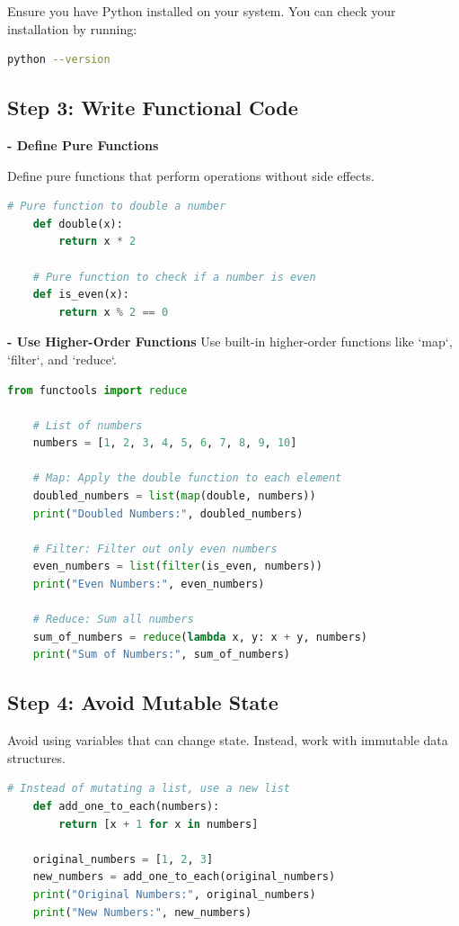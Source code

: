 \documentclass[12pt]{article}
\begin{document}
Ensure you have Python installed on your system. You can check your installation by running:
\begin{lstlisting}[language = sh]
    python --version
\end{lstlisting}

\subsection{Step 3: Write Functional Code}

\textbf{- Define Pure Functions}

Define pure functions that perform operations without side effects.
\begin{lstlisting}[language = Python]
    # Pure function to double a number
    def double(x):
        return x * 2
    
    # Pure function to check if a number is even
    def is_even(x):
        return x % 2 == 0
\end{lstlisting}

\textbf{- Use Higher-Order Functions}
Use built-in higher-order functions like `map`, `filter`, and `reduce`.

\begin{lstlisting}[language = Python]
    from functools import reduce

    # List of numbers
    numbers = [1, 2, 3, 4, 5, 6, 7, 8, 9, 10]
    
    # Map: Apply the double function to each element
    doubled_numbers = list(map(double, numbers))
    print("Doubled Numbers:", doubled_numbers)
    
    # Filter: Filter out only even numbers
    even_numbers = list(filter(is_even, numbers))
    print("Even Numbers:", even_numbers)
    
    # Reduce: Sum all numbers
    sum_of_numbers = reduce(lambda x, y: x + y, numbers)
    print("Sum of Numbers:", sum_of_numbers)
\end{lstlisting}


\subsection{Step 4: Avoid Mutable State}

Avoid using variables that can change state. Instead, work with immutable data structures.
\begin{lstlisting}[language = Python]
    # Instead of mutating a list, use a new list
    def add_one_to_each(numbers):
        return [x + 1 for x in numbers]
    
    original_numbers = [1, 2, 3]
    new_numbers = add_one_to_each(original_numbers)
    print("Original Numbers:", original_numbers)
    print("New Numbers:", new_numbers)
\end{lstlisting}
\end{document}
